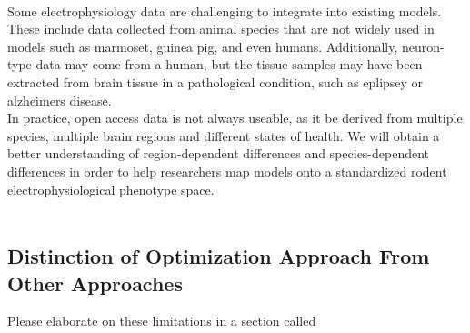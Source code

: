 \\
Some electrophysiology data are challenging to integrate into existing models.
These include data collected from animal species that are not widely used in models such as marmoset, guinea pig, and even humans. 
Additionally, neuron-type data may come from a human, but the tissue samples may have been extracted from brain tissue in a pathological condition, such as eplipsey or alzheimers disease.
\\
In practice, open access data is not always useable, as it be derived from multiple species, multiple brain regions and different states of health. We will obtain a better understanding of region-dependent differences and species-dependent differences in order to help researchers map models onto a standardized rodent electrophysiological phenotype space.\\
\\
\subsection{Distinction of Optimization Approach From Other Approaches}
Please elaborate on these limitations in a section called 



